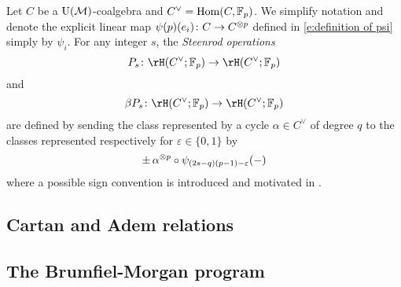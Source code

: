 Let $C$ be a ${\operatorname{U}(\mathcal{M})}$-coalgebra and $C^\vee = \mathrm{Hom}(C, {\mathbb{F}_p})$.
We simplify notation and denote the explicit linear map $\psi(p)(e_i) \colon C \to C^{\otimes p}$ defined in \eqref{e:definition of psi} simply by $\psi_i$.
For any integer $s$, the \textit{Steenrod operations}
\begin{equation*}
P_s \colon \rH(C^\vee; \Fp) \to \rH(C^\vee; \Fp)
\end{equation*}
and
\begin{equation*}
\beta P_s \colon \rH(C^\vee; \Fp) \to \rH(C^\vee; \Fp)
\end{equation*}
are defined by sending the class represented by a cycle $\alpha \in C^\vee$ of degree $q$ to the classes represented respectively for $\varepsilon \in \{0,1\}$ by
\begin{equation*}
\pm \, \alpha^{\otimes p} \circ \psi_{(2s-q)(p-1)-\varepsilon}(-)
\end{equation*}
where a possible sign convention is introduced and motivated in \cite[(6.1)]{steenrod1953cyclic}.

\subsection{Cartan and Adem relations}

\subsection{The Brumfiel-Morgan program}

